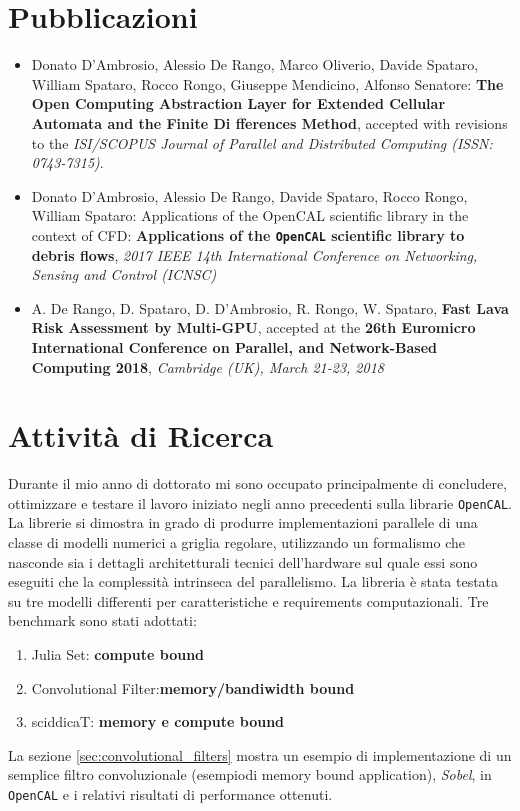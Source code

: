 \section{Pubblicazioni}
\begin{itemize}
	\item  Donato D'Ambrosio, Alessio De Rango, Marco Oliverio, Davide Spataro,
	William Spataro, Rocco Rongo, Giuseppe Mendicino, Alfonso Senatore:
	\textbf{The Open Computing Abstraction Layer for Extended Cellular
	Automata and the Finite Di fferences Method}, accepted with revisions to
	the \textit{ISI/SCOPUS Journal of Parallel and Distributed Computing (ISSN:
	0743-7315)}.

\item Donato D'Ambrosio, Alessio De Rango, Davide Spataro, Rocco Rongo,
William Spataro: Applications of the OpenCAL scientific library in
the context of CFD: \textbf{Applications of the \texttt{OpenCAL} scientific library to debris flows}, \textit{2017 IEEE 14th
International Conference on Networking, Sensing and Control (ICNSC)}

\item A. De Rango, D. Spataro, D. D’Ambrosio, R. Rongo, W. Spataro, \textbf{Fast
Lava Risk Assessment by Multi-GPU}, accepted at the \textbf{26th Euromicro
International Conference on Parallel, and Network-Based Computing
2018}, \textit{Cambridge (UK), March 21-23, 2018}

\end{itemize}


\section{Attività di Ricerca}
Durante il mio  anno di dottorato mi sono occupato principalmente di concludere, ottimizzare e testare il lavoro iniziato negli anno precedenti sulla librarie \texttt{OpenCAL}. La librerie si dimostra in grado di produrre implementazioni parallele di una classe di modelli numerici a griglia regolare, utilizzando un formalismo che nasconde sia i dettagli architetturali tecnici dell'hardware sul quale essi sono eseguiti che la complessità intrinseca del parallelismo. La libreria è stata testata su tre modelli differenti per caratteristiche e requirements computazionali. Tre benchmark sono stati adottati:
\begin{enumerate}
	\item Julia Set: \textbf{compute bound}
	\item Convolutional Filter:\textbf{memory/bandiwidth bound}
	\item sciddicaT: \textbf{memory e compute bound}
\end{enumerate} 
La sezione \ref{sec:convolutional_filters} mostra un esempio di implementazione di un semplice filtro convoluzionale (esempiodi memory bound application), \textit{Sobel}, in \texttt{OpenCAL} e i relativi risultati di performance ottenuti.


